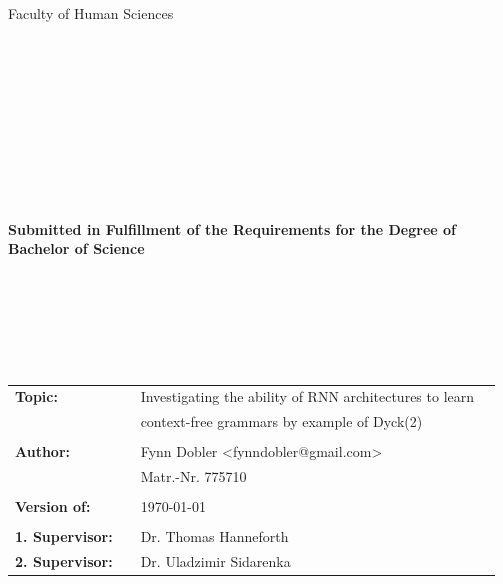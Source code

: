 \begin{center}
\Large{Faculty of Human Sciences}
\end{center}
\begin{verbatim}




\end{verbatim}
\begin{center}
\doublespacing
\textbf{\LARGE{\titleDocument}}\\
\singlespacing
\begin{verbatim}

\end{verbatim}
\textbf{{~\subjectDocument~}}
\end{center}
\begin{verbatim}

\end{verbatim}
\begin{center}

\end{center}
\begin{verbatim}

\end{verbatim}
\begin{center}
\textbf{Submitted in Fulfillment of the Requirements for the Degree of \\ Bachelor of Science}
\end{center}
\begin{verbatim}






\end{verbatim}
\begin{flushleft}
\begin{tabular}{llll}
\textbf{Topic:} & & Investigating the ability of RNN architectures to learn & \\
& & context-free grammars by example of Dyck(2) & \\
& & \\
\textbf{Author:} & & Fynn Dobler <fynndobler@gmail.com>& \\
& & Matr.-Nr. 775710 & \\
& & \\
\textbf{Version of:} & & \today &\\
& & \\
\textbf{1. Supervisor:} & & Dr. Thomas Hanneforth &\\
\textbf{2. Supervisor:} & & Dr. Uladzimir Sidarenka &\\
\end{tabular}
\end{flushleft}

